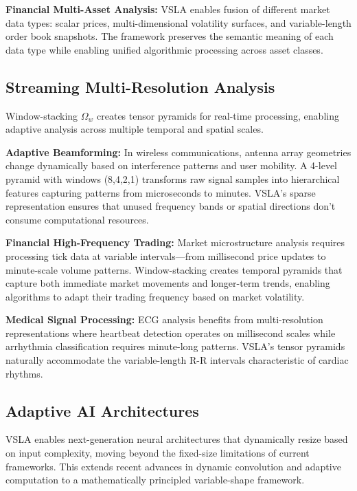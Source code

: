 \textbf{Financial Multi-Asset Analysis:} VSLA enables fusion of different market data types: scalar prices, multi-dimensional volatility surfaces, and variable-length order book snapshots. The framework preserves the semantic meaning of each data type while enabling unified algorithmic processing across asset classes.

\subsection{Streaming Multi-Resolution Analysis}

Window-stacking $\Omega_w$ creates tensor pyramids for real-time processing, enabling adaptive analysis across multiple temporal and spatial scales.

\textbf{Adaptive Beamforming:} In wireless communications, antenna array geometries change dynamically based on interference patterns and user mobility. A 4-level pyramid with windows (8,4,2,1) transforms raw signal samples into hierarchical features capturing patterns from microseconds to minutes. VSLA's sparse representation ensures that unused frequency bands or spatial directions don't consume computational resources.

\textbf{Financial High-Frequency Trading:} Market microstructure analysis requires processing tick data at variable intervals—from millisecond price updates to minute-scale volume patterns. Window-stacking creates temporal pyramids that capture both immediate market movements and longer-term trends, enabling algorithms to adapt their trading frequency based on market volatility.

\textbf{Medical Signal Processing:} ECG analysis benefits from multi-resolution representations where heartbeat detection operates on millisecond scales while arrhythmia classification requires minute-long patterns. VSLA's tensor pyramids naturally accommodate the variable-length R-R intervals characteristic of cardiac rhythms.

\subsection{Adaptive AI Architectures}

VSLA enables next-generation neural architectures that dynamically resize based on input complexity, moving beyond the fixed-size limitations of current frameworks. This extends recent advances in dynamic convolution \cite{WuFan2019} and adaptive computation \cite{Graves2016} to a mathematically principled variable-shape framework.

